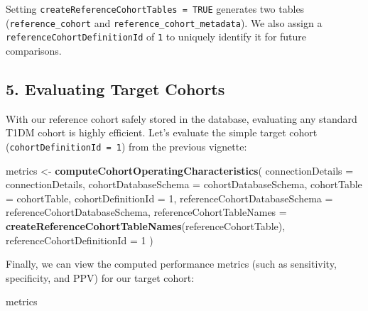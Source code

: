 \documentclass[
]{article}
\newenvironment{Shaded}{\begin{snugshade}}{\end{snugshade}}
\newcommand{\AttributeTok}[1]{\textcolor[rgb]{0.13,0.29,0.53}{#1}}
\newcommand{\DecValTok}[1]{\textcolor[rgb]{0.00,0.00,0.81}{#1}}
\newcommand{\FunctionTok}[1]{\textcolor[rgb]{0.13,0.29,0.53}{\textbf{#1}}}
\newcommand{\NormalTok}[1]{#1}
\newcommand{\OtherTok}[1]{\textcolor[rgb]{0.56,0.35,0.01}{#1}}
\begin{document}
Setting \texttt{createReferenceCohortTables\ =\ TRUE} generates two
tables (\texttt{reference\_cohort} and
\texttt{reference\_cohort\_metadata}). We also assign a
\texttt{referenceCohortDefinitionId} of \texttt{1} to uniquely identify
it for future comparisons.

\subsection{5. Evaluating Target
Cohorts}\label{evaluating-target-cohorts}

With our reference cohort safely stored in the database, evaluating any
standard T1DM cohort is highly efficient. Let's evaluate the simple
target cohort (\texttt{cohortDefinitionId\ =\ 1}) from the previous
vignette:

\begin{Shaded}
\begin{Highlighting}[]
\NormalTok{metrics }\OtherTok{\textless{}{-}} \FunctionTok{computeCohortOperatingCharacteristics}\NormalTok{(}
  \AttributeTok{connectionDetails =}\NormalTok{ connectionDetails,}
  \AttributeTok{cohortDatabaseSchema =}\NormalTok{ cohortDatabaseSchema,}
  \AttributeTok{cohortTable =}\NormalTok{ cohortTable,}
  \AttributeTok{cohortDefinitionId =} \DecValTok{1}\NormalTok{,}
  \AttributeTok{referenceCohortDatabaseSchema =}\NormalTok{ referenceCohortDatabaseSchema,}
  \AttributeTok{referenceCohortTableNames =} \FunctionTok{createReferenceCohortTableNames}\NormalTok{(referenceCohortTable),}
  \AttributeTok{referenceCohortDefinitionId =} \DecValTok{1}
\NormalTok{)}
\end{Highlighting}
\end{Shaded}

Finally, we can view the computed performance metrics (such as
sensitivity, specificity, and PPV) for our target cohort:

\begin{Shaded}
\begin{Highlighting}[]
\NormalTok{metrics}
\end{Highlighting}
\end{Shaded}
\end{document}
